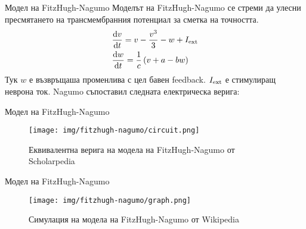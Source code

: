 \begin{frame}[t]{Модел на FitzHugh-Nagumo}
  Моделът на FitzHugh-Nagumo се стреми да улесни пресмятането на трансмембранния потенциал за сметка на точността.
  \begin{align*}
    &\dv{v}{t} = v - \frac{v^{3}}{3} - w + I_{\rm{ext}} \\
    &\dv{w}{t} = \frac{1}{c}\left(v + a - bw\right)
  \end{align*}
  Тук $w$ е възвръщаша променлива с цел бавен feedback. 
  $I_{\rm{ext}}$ е стимулиращ неврона ток.
  Nagumo съпоставил следната електрическа верига:
\end{frame}

\begin{frame}[t]{Модел на FitzHugh-Nagumo}
  \begin{figure}[htbp!]
    \centering
    \texttt{[image: img/fitzhugh-nagumo/circuit.png]}
    \caption{Еквивалентна верига на модела на FitzHugh-Nagumo от Scholarpedia}
  \end{figure}  
\end{frame}

\begin{frame}[t]{Модел на FitzHugh-Nagumo}
  \begin{figure}[htbp!]
    \centering
    \texttt{[image: img/fitzhugh-nagumo/graph.png]}
    \caption{Симулация на модела на FitzHugh-Nagumo от Wikipedia}
  \end{figure}  
\end{frame}